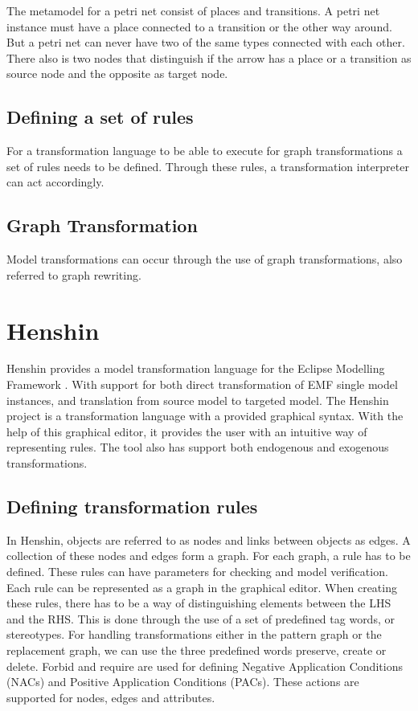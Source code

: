 \documentclass[pdftex,11pt,a4paper]{article}
\begin{document}
The metamodel for a petri net consist of places and transitions. A petri net
instance must have a place connected to a transition or the other way around.
But a petri net can never have two of the same types connected with each other.
There also is two nodes that distinguish if the arrow has a place or a
transition as source node and the opposite as target node.

\subsection{Defining a set of rules}
For a transformation language to be able to execute for graph transformations a
set of rules needs to be defined. Through these rules, a transformation
interpreter can act accordingly. 

\subsection{Graph Transformation}
Model transformations can occur through the use of graph transformations, also
referred to graph rewriting.

\section{Henshin}

Henshin provides a model transformation language for the Eclipse Modelling
Framework \cite{Steinberg2009}. With support for both direct 
transformation of EMF single model instances, and translation from source
model to targeted model. The Henshin project is a transformation language with a
provided graphical syntax. With the help of this graphical editor, it provides
the user with an intuitive way of representing rules. The tool also has support 
both endogenous and exogenous transformations.

\subsection{Defining transformation rules}

In Henshin, objects are referred to as nodes and links between objects as edges.
A collection of these nodes and edges form a graph. For each graph, a rule has
to be defined. These rules can have parameters for checking and model
verification. Each rule can be represented as a graph in the graphical
editor. \newline When creating these rules, there has to be a way of
distinguishing elements between the LHS and the RHS. This is done through the use of
a set of predefined tag words, or stereotypes. For handling transformations
either in the pattern graph or the replacement graph, we can use the three
predefined words preserve, create or delete. Forbid and require are used for
defining Negative Application Conditions (NACs) and Positive Application
Conditions (PACs). These actions are supported for nodes, edges and attributes.
\end{document}
